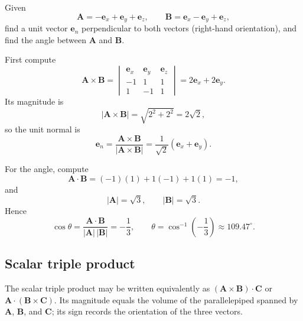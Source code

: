 \begin{example}
Given
\begin{equation}
\mathbf{A}=-\mathbf{e}_x+\mathbf{e}_y+\mathbf{e}_z,
\qquad
\mathbf{B}=\mathbf{e}_x-\mathbf{e}_y+\mathbf{e}_z,
\end{equation}
find a unit vector $\mathbf{e}_n$ perpendicular to both vectors (right-hand orientation), and find the angle between $\mathbf{A}$ and $\mathbf{B}$.

First compute
\begin{equation}
\mathbf{A}\times\mathbf{B}=\begin{vmatrix}
\mathbf{e}_x&\mathbf{e}_y&\mathbf{e}_z\\
-1&1&1\\
1&-1&1
\end{vmatrix}
=2\mathbf{e}_x+2\mathbf{e}_y.
\end{equation}
Its magnitude is
\begin{equation}
|\mathbf{A}\times\mathbf{B}|=\sqrt{2^2+2^2}=2\sqrt{2},
\end{equation}
so the unit normal is
\begin{equation}
\mathbf{e}_n=\frac{\mathbf{A}\times\mathbf{B}}{|\mathbf{A}\times\mathbf{B}|}
=\frac{1}{\sqrt{2}}\left(\mathbf{e}_x+\mathbf{e}_y\right).
\end{equation}

For the angle, compute
\begin{equation}
\mathbf{A}\cdot\mathbf{B}=(-1)(1)+1(-1)+1(1)=-1,
\end{equation}
and
\begin{equation}
|\mathbf{A}|=\sqrt{3},
\qquad
|\mathbf{B}|=\sqrt{3}.
\end{equation}
Hence
\begin{equation}
\cos\theta=\frac{\mathbf{A}\cdot\mathbf{B}}{|\mathbf{A}|\,|\mathbf{B}|}=-\frac{1}{3},
\qquad
\theta=\cos^{-1}\!\left(-\frac{1}{3}\right)\approx 109.47^\circ.
\end{equation}
\end{example}

\subsection{Scalar triple product}
The scalar triple product may be written equivalently as $(\mathbf{A}\times\mathbf{B})\cdot\mathbf{C}$ or $\mathbf{A}\cdot(\mathbf{B}\times\mathbf{C})$. Its magnitude equals the volume of the parallelepiped spanned by $\mathbf{A}$, $\mathbf{B}$, and $\mathbf{C}$; its sign records the orientation of the three vectors.

